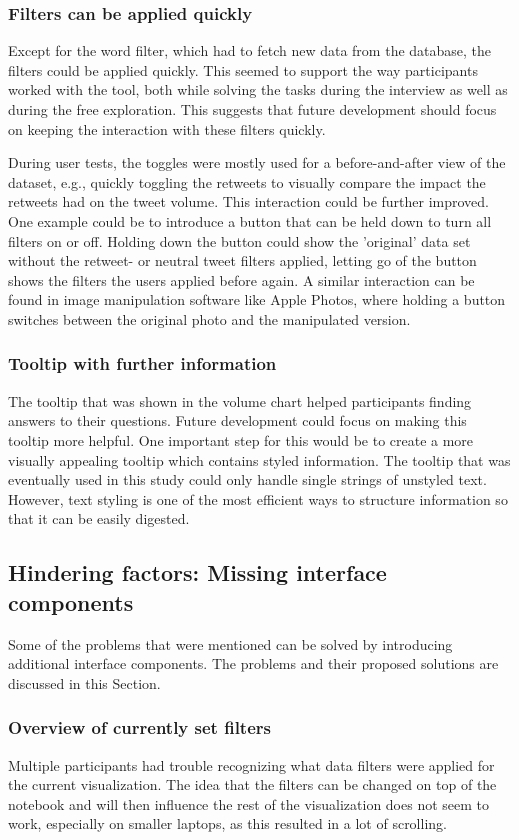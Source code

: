 \subsubsection*{Filters can be applied quickly}
Except for the word filter, which had to fetch new data from the database, the filters could be applied quickly. This seemed to support the way participants worked with the tool, both while solving the tasks during the interview as well as during the free exploration. This suggests that future development should focus on keeping the interaction with these filters quickly.

During user tests, the toggles were mostly used for a before-and-after view of the dataset, e.g., quickly toggling the retweets to visually compare the impact the retweets had on the tweet volume. This interaction could be further improved. One example could be to introduce a button that can be held down to turn all filters on or off. Holding down the button could show the 'original' data set without the retweet- or neutral tweet filters applied, letting go of the button shows the filters the users applied before again. A similar interaction can be found in image manipulation software like Apple Photos, where holding a button switches between the original photo and the manipulated version.

\subsubsection*{Tooltip with further information}
The tooltip that was shown in the volume chart helped participants finding answers to their questions. Future development could focus on making this tooltip more helpful. One important step for this would be to create a more visually appealing tooltip which contains styled information. The tooltip that was eventually used in this study could only handle single strings of unstyled text. However, text styling is one of the most efficient ways to structure information so that it can be easily digested. 

\subsection{Hindering factors: Missing interface components}
Some of the problems that were mentioned can be solved by introducing additional interface components. The problems and their proposed solutions are discussed in this Section.

\subsubsection*{Overview of currently set filters}
Multiple participants had trouble recognizing what data filters were applied for the current visualization. The idea that the filters can be changed on top of the notebook and will then influence the rest of the visualization does not seem to work, especially on smaller laptops, as this resulted in a lot of scrolling.

